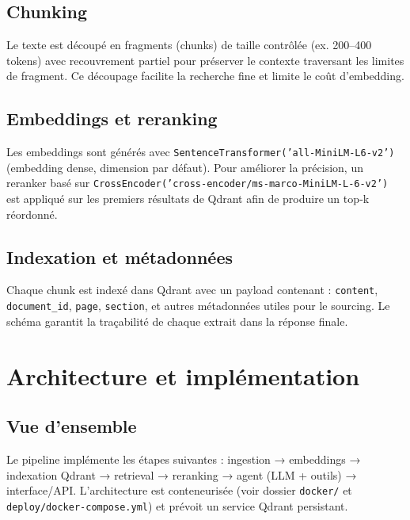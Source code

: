 \documentclass[12pt,a4paper]{report}
\begin{document}
\section{Chunking}
Le texte est découpé en fragments (chunks) de taille contrôlée (ex. 200–400 tokens) avec recouvrement partiel pour préserver le contexte traversant les limites de fragment. Ce découpage facilite la recherche fine et limite le coût d'embedding.

\section{Embeddings et reranking}
Les embeddings sont générés avec \texttt{SentenceTransformer('all-MiniLM-L6-v2')} (embedding dense, dimension par défaut). Pour améliorer la précision, un reranker basé sur \texttt{CrossEncoder('cross-encoder/ms-marco-MiniLM-L-6-v2')} est appliqué sur les premiers résultats de Qdrant afin de produire un top‑k réordonné.

\section{Indexation et métadonnées}
Chaque chunk est indexé dans Qdrant avec un payload contenant : \texttt{content}, \texttt{document\_id}, \texttt{page}, \texttt{section}, et autres métadonnées utiles pour le sourcing. Le schéma garantit la traçabilité de chaque extrait dans la réponse finale.

\chapter{Architecture et implémentation}
\section{Vue d'ensemble}
Le pipeline implémente les étapes suivantes : ingestion → embeddings → indexation Qdrant → retrieval → reranking → agent (LLM + outils) → interface/API. L'architecture est conteneurisée (voir dossier \texttt{docker/} et \texttt{deploy/docker-compose.yml}) et prévoit un service Qdrant persistant.
\end{document}
